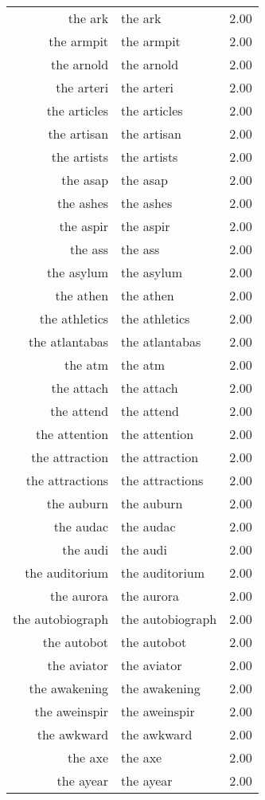 \begin{table}[ht]
\begin{tabular}{rlr}
  the ark & the ark & 2.00 \\ 
  the armpit & the armpit & 2.00 \\ 
  the arnold & the arnold & 2.00 \\ 
  the arteri & the arteri & 2.00 \\ 
  the articles & the articles & 2.00 \\ 
  the artisan & the artisan & 2.00 \\ 
  the artists & the artists & 2.00 \\ 
  the asap & the asap & 2.00 \\ 
  the ashes & the ashes & 2.00 \\ 
  the aspir & the aspir & 2.00 \\ 
  the ass & the ass & 2.00 \\ 
  the asylum & the asylum & 2.00 \\ 
  the athen & the athen & 2.00 \\ 
  the athletics & the athletics & 2.00 \\ 
  the atlantabas & the atlantabas & 2.00 \\ 
  the atm & the atm & 2.00 \\ 
  the attach & the attach & 2.00 \\ 
  the attend & the attend & 2.00 \\ 
  the attention & the attention & 2.00 \\ 
  the attraction & the attraction & 2.00 \\ 
  the attractions & the attractions & 2.00 \\ 
  the auburn & the auburn & 2.00 \\ 
  the audac & the audac & 2.00 \\ 
  the audi & the audi & 2.00 \\ 
  the auditorium & the auditorium & 2.00 \\ 
  the aurora & the aurora & 2.00 \\ 
  the autobiograph & the autobiograph & 2.00 \\ 
  the autobot & the autobot & 2.00 \\ 
  the aviator & the aviator & 2.00 \\ 
  the awakening & the awakening & 2.00 \\ 
  the aweinspir & the aweinspir & 2.00 \\ 
  the awkward & the awkward & 2.00 \\ 
  the axe & the axe & 2.00 \\ 
  the ayear & the ayear & 2.00 \\ 

\end{tabular}
\end{table}
